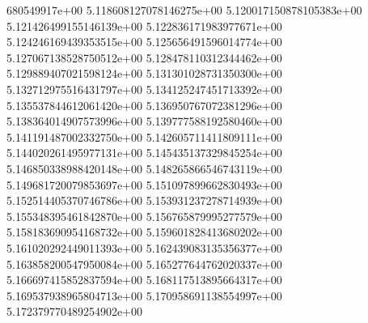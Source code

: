 680549917e+00	5.118608127078146275e+00	5.120017150878105383e+00	5.121426499155146139e+00	5.122836171983977671e+00	5.124246169439353515e+00	5.125656491596014774e+00	5.127067138528750512e+00	5.128478110312344462e+00	5.129889407021598124e+00	5.131301028731350300e+00	5.132712975516431797e+00	5.134125247451713392e+00	5.135537844612061420e+00	5.136950767072381296e+00	5.138364014907573996e+00	5.139777588192580460e+00	5.141191487002332750e+00	5.142605711411809111e+00	5.144020261495977131e+00	5.145435137329845254e+00	5.146850338988420148e+00	5.148265866546743119e+00	5.149681720079853697e+00	5.151097899662830493e+00	5.152514405370746786e+00	5.153931237278714939e+00	5.155348395461842870e+00	5.156765879995277579e+00	5.158183690954168732e+00	5.159601828413680202e+00	5.161020292449011393e+00	5.162439083135356377e+00	5.163858200547950084e+00	5.165277644762020337e+00	5.166697415852837594e+00	5.168117513895664317e+00	5.169537938965804713e+00	5.170958691138554997e+00	5.172379770489254902e+00
